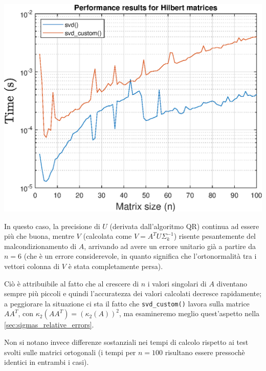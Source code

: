\newpage
\includegraphics[scale=.9]{imgs/06_-_Performance_results_for_Hilbert_matrices.eps}
\par \vspace{15pt}

\raggedright %
In questo caso, la precisione di $U$ (derivata dall'algoritmo QR) continua ad 
essere più che buona, mentre $V$ (calcolata come $V = A^T U \Sigma_{k}^{-1}$) 
risente pesantemente del malcondizionamento di $A$, arrivando ad avere un errore 
unitario già a partire da $n = 6$ (che è un errore considerevole, in quanto 
significa che l'ortonormalità tra i vettori colonna di $V$ è stata completamente 
persa).

Ciò è attribuibile al fatto che al crescere di $n$ i valori singolari di $A$ 
diventano sempre più piccoli e quindi l'accuratezza dei valori calcolati 
decresce rapidamente; a peggiorare la situazione ci sta il fatto che 
\texttt{svd\_custom()} lavora sulla matrice $A A^T$, con
$\kappa_2(A A^T) = (\kappa_2(A))^2$, ma esamineremo meglio quest'aspetto 
nella \autoref{sec:sigmas_relative_errors}.

Non si notano invece differenze sostanziali nei tempi di calcolo rispetto ai 
test svolti sulle matrici ortogonali (i tempi per $n = 100$ risultano essere 
pressochè identici in entrambi i casi).


